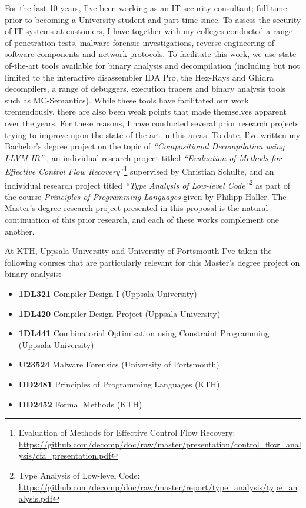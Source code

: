 \documentclass[12pt, a4paper]{article}
\begin{document}
For the last 10 years, I've been working as an IT-security consultant; full-time prior to becoming a University student and part-time since. To assess the security of IT-systems at customers, I have together with my colleges conducted a range of penetration tests, malware forensic investigations, reverse engineering of software components and network protocols. To facilitate this work, we use state-of-the-art tools available for binary analysis and decompilation (including but not limited to the interactive disassembler IDA Pro, the Hex-Rays and Ghidra decompilers, a range of debuggers, execution tracers and binary analysis tools such as MC-Semantics). While these tools have facilitated our work tremendously, there are also been weak points that made themselves apparent over the years. For these reasons, I have conducted several prior research projects trying to improve upon the state-of-the-art in this areas. To date, I've written my Bachelor's degree project on the topic of \textit{``Compositional Decompilation using LLVM IR''} \cite{compositional_decompilation}, an individual research project titled \textit{``Evaluation of Methods for Effective Control Flow Recovery''}\footnote{Evaluation of Methods for Effective Control Flow Recovery: \url{https://github.com/decomp/doc/raw/master/presentation/control_flow_analysis/cfa_presentation.pdf}} supervised by Christian Schulte, and an individual research project titled \textit{``Type Analysis of Low-level Code''}\footnote{Type Analysis of Low-level Code: \url{https://github.com/decomp/doc/raw/master/report/type_analysis/type_analysis.pdf}} as part of the course \textit{Principles of Programming Languages} given by Philipp Haller. The Master's degree research project presented in this proposal is the natural continuation of this prior research, and each of these works complement one another.

At KTH, Uppsala University and University of Portsmouth I've taken the following courses that are particularly relevant for this Master's degree project on binary analysis:

\begin{itemize}
	\item \textbf{1DL321} Compiler Design I (Uppsala University)
	\item \textbf{1DL420} Compiler Design Project (Uppsala University)
	\item \textbf{1DL441} Combinatorial Optimisation using Constraint Programming (Uppsala University)
	\item \textbf{U23524} Malware Forensics (University of Portsmouth)
	\item \textbf{DD2481} Principles of Programming Languages (KTH)
	\item \textbf{DD2452} Formal Methods (KTH)
\end{itemize}
\end{document}
